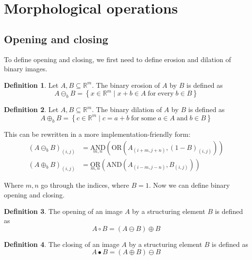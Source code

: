 \documentclass[a4paper,12pt]{article}
\theoremstyle{plain}
\theoremstyle{definition}
\newtheorem{definition}{Definition}
\theoremstyle{remark}
\begin{document}
	\newpage
	
	\section{Morphological operations}
	
	\subsection{Opening and closing}
	
	To define opening and closing, we first need to define erosion and dilation of binary images.
	
	\begin{definition}
		Let $A, B \subseteq \mathbb{R}^m$. The binary erosion of $A$ by $B$ is defined as
		\begin{equation*}
			A \ominus_b B = \left\{ x \in \mathbb{R}^m \mid x + b \in A \; \mathrm{for \; every} \; b \in B \right\}
		\end{equation*}
	\end{definition}
	\begin{definition}
		Let $A, B \subseteq \mathbb{R}^m$. The binary dilation of $A$ by $B$ is defined as
		\begin{equation*}
			A \oplus_b B = \left\{ c \in \mathbb{R}^m \mid c = a + b \; \mathrm{for \; some} \; a \in A \; \mathrm{and} \; b \in B \right\}
		\end{equation*}
	\end{definition}
	
	This can be rewritten in a more implementation-friendly form:
	\begin{align*}
		(A \ominus_b B)_{(i, j)} &= \underset{m, n}{\mathrm{AND}} \left( \mathrm{OR} (A_{(i + m, j + n)}, (1 - B)_{(i, j)}) \right) \\
		(A \oplus_b B)_{(i, j)} &= \underset{m, n}{\mathrm{OR}} \left( \mathrm{AND} (A_{(i - m, j - n)}, B_{(i, j)}) \right)
	\end{align*}
	
	Where $m, n$ go through the indices, where $B = 1$. Now we can define binary opening and closing.
	
	\begin{definition}
		The opening of an image $A$ by a structuring element $B$ is defined as
		\begin{equation*}
			A \circ B = (A \ominus B) \oplus B
		\end{equation*}
	\end{definition}
	\begin{definition}
		The closing of an image $A$ by a structuring element $B$ is defined as
		\begin{equation*}
			A \bullet B = (A \oplus B) \ominus B
		\end{equation*}
	\end{definition}
	
\end{document}
